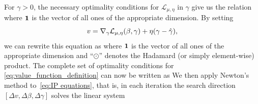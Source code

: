 For $\gamma>0$, the necessary optimality conditions 
for $\mathcal{L}_{\mu,\eta}$ in $\gamma$ give us the relation 
where $\mathbf{1}$ is the vector of all ones of the 
appropriate dimension.
By setting 
\[
v=\nabla_\gamma \mathcal{L}_{\mu,\eta}(\beta,\gamma)+\eta(\gamma - \hat \gamma),
\] 
we can rewrite this equation as
where $\mathbf{1}$ is the vector of all ones of the appropriate dimension and
``$\odot$'' denotes the Hadamard (or simply element-wise) product.
The complete set of optimality conditions for 
\eqref{eq:value_function_definition} can now be written as
We then apply Newton's method to~\eqref{eq:IP equations}, 
that is, in each iteration the search direction $[\Delta v, \Delta \beta, \Delta \gamma]$ solves the linear system
